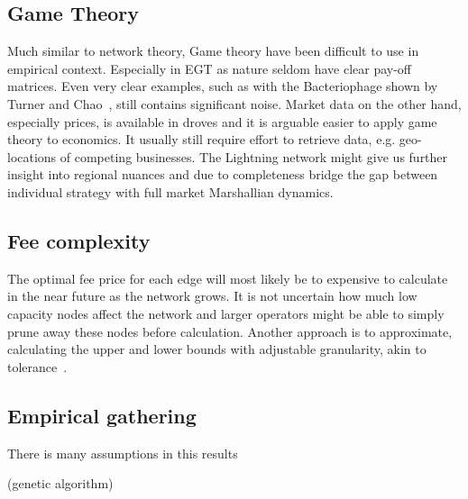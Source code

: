 \subsection{Game Theory}

Much similar to network theory, Game theory have been difficult to use in empirical context. Especially in EGT as nature seldom have clear pay-off matrices. Even very clear examples, such as with the Bacteriophage shown by Turner and Chao~\cite{turner:chao:prisoners:dilemma, nowak:sigmund:phage}, still contains significant noise. Market data on the other hand, especially prices, is available in droves and it is arguable easier to apply game theory to economics. It usually still require effort to retrieve data, e.g. geo-locations of competing businesses. The Lightning network might give us further insight into regional nuances and due to completeness bridge the gap between individual strategy with full market Marshallian dynamics.    

\subsection{Fee complexity}

The optimal fee price for each edge will most likely be to expensive to calculate in the near future as the network grows. It is not uncertain how much low capacity nodes affect the network and larger operators might be able to simply prune away these nodes before calculation. Another approach is to approximate, calculating the upper and lower bounds with adjustable granularity, akin to tolerance~\cite{goldengorin:jager:tolerance}. 

\subsection{Empirical gathering}

There is many assumptions in this results

(genetic algorithm)


